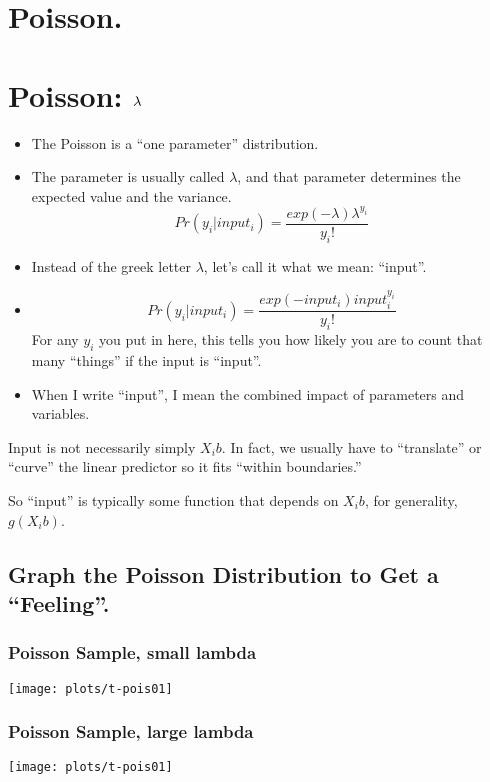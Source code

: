 \documentclass[10pt,english]{beamer}
\def\lyxframeend{} %
\begin{document}
\lyxframeend{}\section{Poisson.}


\lyxframeend{}\section{Poisson: $\mbox{\ensuremath{\lambda}}$}
\begin{itemize}
\item The Poisson is a ``one parameter'' distribution. 
\item The parameter is usually called $\lambda$, and that parameter determines
the expected value and the variance.
\[
Pr(y_{i}|input_{i})=\frac{exp(-\lambda)\lambda^{y_{i}}}{y_{i}!}
\]

\end{itemize}

\lyxframeend{}
\begin{itemize}
\item Instead of the greek letter $\lambda$, let's call it what we mean:
``input''.
\item 
\[
Pr(y_{i}|input_{i})=\frac{exp(-input_{i})input_{i}^{y_{i}}}{y_{i}!}
\]
For any $y_{i}$ you put in here, this tells you how likely you are
to count that many ``things'' if the input is ``input''. 
\item When I write ``input'', I mean the combined impact of parameters
and variables. 
\end{itemize}
Input is not necessarily simply $X_{i}b$. In fact, we usually have
to ``translate'' or ``curve'' the linear predictor so it fits
``within boundaries.'' 

So ``input'' is typically some function that depends on $X_{i}b$,
for generality, $g(X_{i}b)$.


\lyxframeend{}


\lyxframeend{}\subsection{Graph the Poisson Distribution to Get a ``Feeling''.}

\begin{frame}[containsverbatim]
\frametitle{Poisson Sample, small lambda}
\texttt{[image: plots/t-pois01]}
\end{frame}

\begin{frame}[containsverbatim]
\frametitle{Poisson Sample, large lambda}
\texttt{[image: plots/t-pois01]}
\end{frame}
\end{document}
